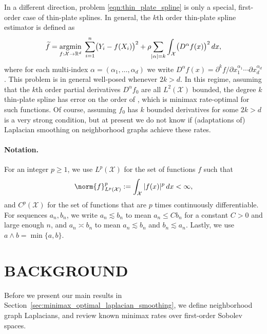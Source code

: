 \documentclass[twoside]{article}
\newcommand{\Reals}{\mathbb{R}}
\newcommand{\1}{\mathbf{1}}
\DeclareMathOperator*{\argmin}{argmin}
\newcommand{\Rd}{\Reals^d}
\newcommand{\Xset}{\mathcal{X}}
\newcommand{\Leb}{L}
\newcommand{\wt}[1]{\widetilde{#1}}
\theoremstyle{definition}
\theoremstyle{remark}
\begin{document}
In a different direction, problem \eqref{eqn:thin_plate_spline} is only a special, first-order case of thin-plate splines. In general, the $k$th order thin-plate spline estimator is defined as
\begin{equation*}
\wt{f} = \argmin_{f : \Xset \to \Rd} \; \sum_{i = 1}^{n} \bigl(Y_i - f(X_i)\bigr)^2 + \rho \hspace{-2pt} \sum_{|\alpha| = k} \int_{\Xset} \bigl(D^\alpha f(x)\bigr)^2 \,dx,
\end{equation*}
where for each multi-index $\alpha=(\alpha_1,\ldots,\alpha_d)$ we write $D^\alpha f(x) = \partial^kf/\partial x_{1}^{\alpha_1} \cdots \partial x_{d}^{\alpha_d}$. This problem is in general well-posed whenever $2k > d$. In this regime, assuming that the $k$th order partial derivatives $D^\alpha f_0$ are all $\Leb^2(\Xset)$ bounded, the degree $k$ thin-plate spline has error on the order of  \citep{vandergeer2000}, which is minimax rate-optimal for such functions. Of course, assuming $f_0$ has $k$ bounded derivatives for some $2k > d$ is a very strong condition, but at present we do not know if (adaptations of) Laplacian smoothing on neighborhood graphs achieve these rates.

\paragraph{Notation.}

For an integer $p \geq 1$, we use $\Leb^p(\Xset)$ for the set of functions $f$ such that 
\begin{equation*}
\norm{f}_{\Leb^p(\Xset)}^p := \int_{\Xset} |f(x)|^p \,dx < \infty,
\end{equation*}
and $C^p(\Xset)$ for the set of functions that are $p$ times continuously differentiable. For sequences $a_n,b_n$, we write $a_n \lesssim b_n$ to mean $a_n \leq Cb_n$ for a constant $C>0$ and large enough $n$, and $a_n \asymp b_n$ to mean $a_n \lesssim b_n$ and $b_n \lesssim a_n$. Lastly, we use $a \wedge b = \min\{a,b\}$.

\section{BACKGROUND}
\label{sec:problem_setup_and_background}

Before we present our main results in Section~\ref{sec:minimax_optimal_laplacian_smoothing}, we define neighborhood graph Laplacians, and review known minimax rates over first-order Sobolev spaces.
\end{document}
